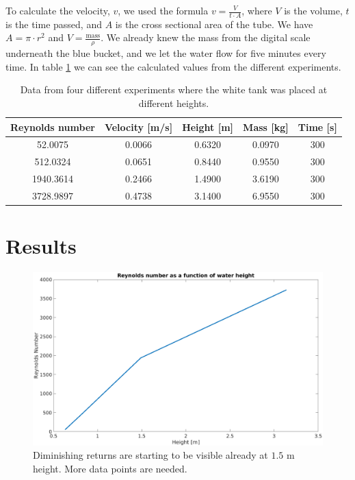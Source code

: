\documentclass[english,a4paper,12pt]{article}
\begin{document}
To calculate the velocity, $v$, we used the formula $v=\frac{V}{t\cdot A}$, where $V$ is the volume, $t$ is the time passed, and $A$ is the cross sectional area of the tube. We have $A=\pi \cdot r^2$ and $V=\frac{\text{mass}}{\rho}$. We already knew the mass from the digital scale underneath the blue bucket, and we let the water flow for five minutes every time. In table \ref{tab:1} we can see the calculated values from the different experiments.

\begin{table}[h!]
    \centering
    \begin{tabular}{|c|c|c|c|c|}\hline
    Reynolds number & Velocity [m/s] & Height [m] & Mass [kg] & Time [s] \\ \hline
    52.0075 & 0.0066 & 0.6320 & 0.0970 & 300\\ \hline
    512.0324 & 0.0651 & 0.8440 & 0.9550 & 300\\ \hline
    1940.3614 & 0.2466 & 1.4900 & 3.6190 & 300\\ \hline
    3728.9897 & 0.4738 & 3.1400 & 6.9550 & 300\\ \hline
    \end{tabular}
    \caption{Data from four different experiments where the white tank was placed at different heights.}
    \label{tab:1}
\end{table}

\section*{Results}

\begin{figure}[H]
    \centering
    \includegraphics[width=180mm]{ReVsHeightPlot.png}
    \caption{Diminishing returns are starting to be visible already at $1.5$ m height. More data points are needed.}
    \label{fig:2}
\end{figure}
\end{document}
